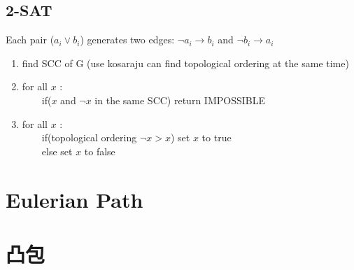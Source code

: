 \documentclass[a4paper]{article}
\begin{document}
\begin{CJK*}{UTF8}{bkai}
    \subsection{2-SAT}
    Each pair ($a_i \lor b_i$) generates two edges: $\lnot a_i \rightarrow b_i$ and $\lnot b_i \rightarrow a_i$
    \begin{enumerate}
        \item find SCC of G (use kosaraju can find topological ordering at the same time)
        \item for all $x$ : \\
        　　if($x$ and $\lnot x$ in the same SCC) return IMPOSSIBLE
        \item for all $x$ :\\
        　　if(topological ordering $\lnot x > x$) set $x$ to true\\
        　　else set $x$ to false
    \end{enumerate}

    \newpage

    \section{Eulerian Path}
    

    \newpage
    \section{凸包}


\end{CJK*}
\end{document}
